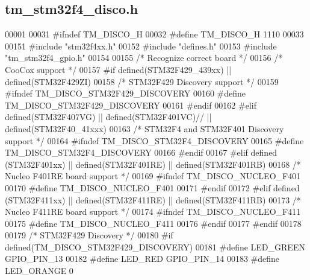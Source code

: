 \hypertarget{tm__stm32f4__disco_8h_source}{}\subsection{tm\+\_\+stm32f4\+\_\+disco.\+h}

\begin{DoxyCode}
00001 
00031 \textcolor{preprocessor}{#ifndef TM\_DISCO\_H}
00032 \textcolor{preprocessor}{#define TM\_DISCO\_H 1110}
00033 
00151 \textcolor{preprocessor}{#include "stm32f4xx.h"}
00152 \textcolor{preprocessor}{#include "defines.h"}
00153 \textcolor{preprocessor}{#include "tm\_stm32f4\_gpio.h"}
00154 
00155 \textcolor{comment}{/* Recognize correct board */}
00156 \textcolor{comment}{/* CooCox support */}
00157 \textcolor{preprocessor}{#if defined(STM32F429\_439xx) || defined(STM32F429ZI)}
00158     \textcolor{comment}{/* STM32F429 Discovery support */}
00159 \textcolor{preprocessor}{    #ifndef TM\_DISCO\_STM32F429\_DISCOVERY}
00160 \textcolor{preprocessor}{        #define TM\_DISCO\_STM32F429\_DISCOVERY}
00161 \textcolor{preprocessor}{    #endif }
00162 \textcolor{preprocessor}{#elif defined(STM32F407VG) || defined(STM32F401VC)// || defined(STM32F40\_41xxx)}
00163     \textcolor{comment}{/* STM32F4 and STM32F401 Discovery support */}
00164 \textcolor{preprocessor}{    #ifndef TM\_DISCO\_STM32F4\_DISCOVERY}
00165 \textcolor{preprocessor}{        #define TM\_DISCO\_STM32F4\_DISCOVERY}
00166 \textcolor{preprocessor}{    #endif}
00167 \textcolor{preprocessor}{#elif defined (STM32F401xx) || defined(STM32F401RE) || defined(STM32F401RB)}
00168     \textcolor{comment}{/* Nucleo F401RE board support */}
00169 \textcolor{preprocessor}{    #ifndef TM\_DISCO\_NUCLEO\_F401}
00170 \textcolor{preprocessor}{        #define TM\_DISCO\_NUCLEO\_F401}
00171 \textcolor{preprocessor}{    #endif}
00172 \textcolor{preprocessor}{#elif defined (STM32F411xx) || defined(STM32F411RE) || defined(STM32F411RB)}
00173     \textcolor{comment}{/* Nucleo F411RE board support */}
00174 \textcolor{preprocessor}{    #ifndef TM\_DISCO\_NUCLEO\_F411}
00175 \textcolor{preprocessor}{        #define TM\_DISCO\_NUCLEO\_F411}
00176 \textcolor{preprocessor}{    #endif}
00177 \textcolor{preprocessor}{#endif}
00178 
00179 \textcolor{comment}{/* STM32F429 Discovery */}
00180 \textcolor{preprocessor}{#if defined(TM\_DISCO\_STM32F429\_DISCOVERY)}
00181 \textcolor{preprocessor}{    #define LED\_GREEN                   GPIO\_PIN\_13}
00182 \textcolor{preprocessor}{    #define LED\_RED                     GPIO\_PIN\_14}
00183 \textcolor{preprocessor}{    #define LED\_ORANGE                  0}

\end{DoxyCode}
